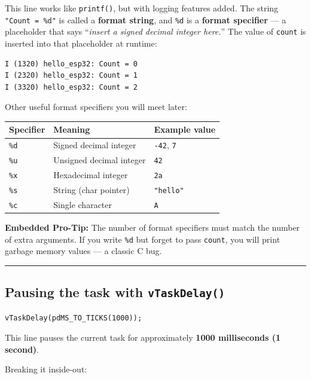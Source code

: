 \documentclass[11pt]{article}
\begin{document}
This line works like \texttt{printf()}, but with logging features added. The string \texttt{"Count = \%d"} is called a \textbf{format string}, and \texttt{\%d} is a \textbf{format specifier} --- a placeholder that says ``\emph{insert a signed decimal integer here.}'' The value of \texttt{count} is inserted into that placeholder at runtime:

\begin{verbatim}
I (1320) hello_esp32: Count = 0
I (2320) hello_esp32: Count = 1
I (3320) hello_esp32: Count = 2
\end{verbatim}

Other useful format specifiers you will meet later:

\begin{table}[htbp]
\centering
\renewcommand{\arraystretch}{1.2}
\begin{tabular}{@{}lll@{}}
\toprule
\textbf{Specifier} & \textbf{Meaning} & \textbf{Example value} \\
\midrule
\texttt{\%d} & Signed decimal integer & \texttt{-42}, \texttt{7} \\
\texttt{\%u} & Unsigned decimal integer & \texttt{42} \\
\texttt{\%x} & Hexadecimal integer & \texttt{2a} \\
\texttt{\%s} & String (char pointer) & \texttt{"hello"} \\
\texttt{\%c} & Single character & \texttt{A} \\
\bottomrule
\end{tabular}
\end{table}

\textbf{Embedded Pro-Tip:} The number of format specifiers must match the number of extra arguments. If you write \texttt{\%d} but forget to pass \texttt{count}, you will print garbage memory values --- a classic C bug.

\bigskip
\noindent\rule{\textwidth}{0.4pt}
\bigskip

\subsection*{Pausing the task with \texttt{vTaskDelay()}}

\begin{verbatim}
vTaskDelay(pdMS_TO_TICKS(1000));
\end{verbatim}

This line pauses the current task for approximately \textbf{1000 milliseconds (1 second)}.

Breaking it inside-out:
\end{document}
